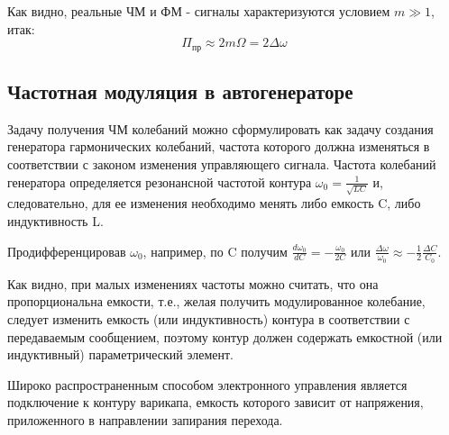 Как видно, реальные ЧМ и ФМ - сигналы характеризуются условием $m\gg1$, итак:
\begin{equation}
	\Pi_\text{пр} \approx 2 m \Omega=2 \Delta \omega
\end{equation}

\subsection{Частотная модуляция в автогенераторе}
Задачу получения ЧМ колебаний можно сформулировать как задачу создания генератора гармонических колебаний, частота которого должна изменяться в соответствии с законом изменения управляющего сигнала. Частота колебаний генератора
определяется резонансной частотой контура $\omega_{0}=\frac{1}{\sqrt{L C}}$ и, следовательно, для ее
изменения необходимо менять либо емкость C, либо индуктивность L.
		
Продифференцировав $\omega_0$, например, по C получим $\frac{d \omega_{0}}{d C}=-\frac{\omega_{0}}{2 C}$ или $\frac{\Delta \omega}{\omega_{0}} \approx-\frac{1}{2} \frac{\Delta C}{C_{0}}$.

Как видно, при малых изменениях частоты можно считать, что она пропорциональна емкости, т.е., желая получить модулированное колебание, следует изменить емкость (или индуктивность) контура в соответствии с передаваемым сообщением, поэтому контур должен содержать емкостной (или индуктивный) параметрический элемент.

Широко распространенным способом электронного управления является подключение к контуру варикапа, емкость которого зависит от напряжения, приложенного в направлении запирания перехода.

